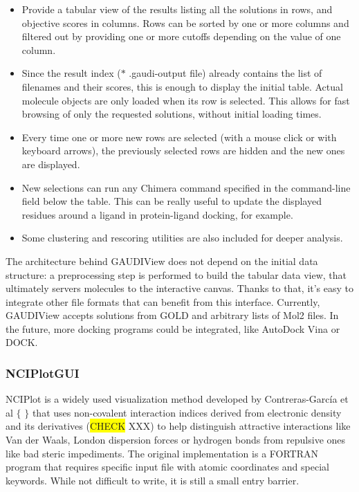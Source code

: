 \begin{itemize}
	\item Provide a tabular view of the results listing all the solutions in rows, and objective scores in columns. Rows can be sorted by one or more columns and filtered out by providing one or more cutoffs depending on the value of one column.

	\item Since the result index ($\ast$ .gaudi-output file) already contains the list of filenames and their scores, this is enough to display the initial table. Actual molecule objects are only loaded when its row is selected. This allows for fast browsing of only the requested solutions, without initial loading times.

	\item Every time one or more new rows are selected (with a mouse click or with keyboard arrows), the previously selected rows are hidden and the new ones are displayed.

	\item New selections can run any Chimera command specified in the command-line field below the table. This can be really useful to update the displayed residues around a ligand in protein-ligand docking, for example.

	\item Some clustering and rescoring utilities are also included for deeper analysis.
\end{itemize}

The architecture behind GAUDIView does not depend on the initial data structure: a preprocessing step is performed to build the tabular data view, that ultimately servers molecules to the interactive canvas. Thanks to that, it’s easy to integrate other file formats that can benefit from this interface. Currently, GAUDIView accepts solutions from GOLD and arbitrary lists of Mol2 files. In the future, more docking programs could be integrated, like AutoDock Vina or DOCK.

\subsubsection{NCIPlotGUI}
NCIPlot is a widely used visualization method developed by Contreras-García et al $ \{ $ $ \} $  that uses non-covalent interaction indices derived from electronic density and its derivatives (\colorbox{yellow}{CHECK} XXX) to help distinguish attractive interactions like Van der Waals, London dispersion forces or hydrogen bonds from repulsive ones like bad steric impediments. The original implementation is a FORTRAN program that requires specific input file with atomic coordinates and special keywords. While not difficult to write, it is still a small entry barrier.

